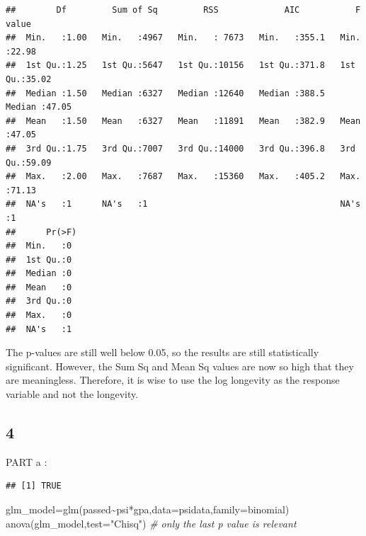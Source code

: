 \documentclass[
]{article}
\newenvironment{Shaded}{\begin{snugshade}}{\end{snugshade}}
\newcommand{\AttributeTok}[1]{\textcolor[rgb]{0.77,0.63,0.00}{#1}}
\newcommand{\CommentTok}[1]{\textcolor[rgb]{0.56,0.35,0.01}{\textit{#1}}}
\newcommand{\FunctionTok}[1]{\textcolor[rgb]{0.00,0.00,0.00}{#1}}
\newcommand{\NormalTok}[1]{#1}
\newcommand{\OtherTok}[1]{\textcolor[rgb]{0.56,0.35,0.01}{#1}}
\newcommand{\SpecialCharTok}[1]{\textcolor[rgb]{0.00,0.00,0.00}{#1}}
\newcommand{\StringTok}[1]{\textcolor[rgb]{0.31,0.60,0.02}{#1}}
\begin{document}
\begin{verbatim}
##        Df         Sum of Sq         RSS             AIC           F value     
##  Min.   :1.00   Min.   :4967   Min.   : 7673   Min.   :355.1   Min.   :22.98  
##  1st Qu.:1.25   1st Qu.:5647   1st Qu.:10156   1st Qu.:371.8   1st Qu.:35.02  
##  Median :1.50   Median :6327   Median :12640   Median :388.5   Median :47.05  
##  Mean   :1.50   Mean   :6327   Mean   :11891   Mean   :382.9   Mean   :47.05  
##  3rd Qu.:1.75   3rd Qu.:7007   3rd Qu.:14000   3rd Qu.:396.8   3rd Qu.:59.09  
##  Max.   :2.00   Max.   :7687   Max.   :15360   Max.   :405.2   Max.   :71.13  
##  NA's   :1      NA's   :1                                      NA's   :1      
##      Pr(>F) 
##  Min.   :0  
##  1st Qu.:0  
##  Median :0  
##  Mean   :0  
##  3rd Qu.:0  
##  Max.   :0  
##  NA's   :1
\end{verbatim}

The p-values are still well below 0.05, so the results are still
statistically significant. However, the Sum Sq and Mean Sq values are
now so high that they are meaningless. Therefore, it is wise to use the
log longevity as the response variable and not the longevity.

\hypertarget{section-3}{%
\subsection{4}\label{section-3}}

PART a :

\begin{Shaded}
\end{Shaded}

\begin{verbatim}
## [1] TRUE
\end{verbatim}

\begin{Shaded}
\begin{Highlighting}[]
\NormalTok{glm\_model}\OtherTok{=}\FunctionTok{glm}\NormalTok{(passed}\SpecialCharTok{\textasciitilde{}}\NormalTok{psi}\SpecialCharTok{*}\NormalTok{gpa,}\AttributeTok{data=}\NormalTok{psidata,}\AttributeTok{family=}\NormalTok{binomial)}
\FunctionTok{anova}\NormalTok{(glm\_model,}\AttributeTok{test=}\StringTok{"Chisq"}\NormalTok{) }\CommentTok{\# only the last p value is relevant}
\end{Highlighting}
\end{Shaded}
\end{document}
